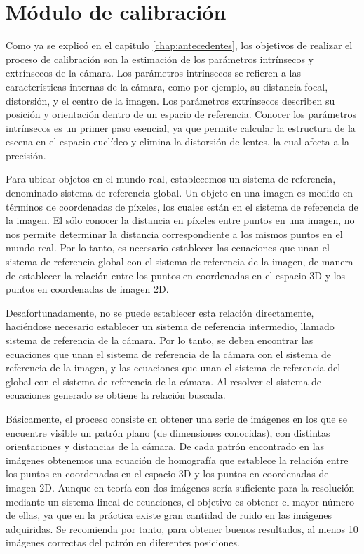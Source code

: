\section{Módulo de calibración}
Como ya se explicó en el capitulo \ref{chap:antecedentes}, los objetivos de realizar el proceso de calibración son la estimación de los parámetros intrínsecos y extrínsecos de la cámara. Los parámetros intrínsecos se refieren a las características internas de la cámara, como por ejemplo, su distancia focal, distorsión, y el centro de la imagen. Los parámetros extrínsecos describen su posición y orientación dentro de un espacio de referencia. Conocer los parámetros intrínsecos es un primer paso esencial, ya que permite calcular la estructura de la escena en el espacio euclídeo y elimina la distorsión de lentes, la cual afecta a la precisión.

Para ubicar objetos en el mundo real, establecemos un sistema de referencia, denominado sistema de referencia global. Un objeto en una imagen es medido en términos de coordenadas de píxeles, los cuales están en el sistema de referencia de la imagen. El sólo conocer la distancia en píxeles entre puntos en una imagen, no nos permite determinar la distancia correspondiente a los mismos puntos en el mundo real. Por lo tanto, es necesario establecer las ecuaciones que unan el sistema de referencia global con el sistema de referencia de la imagen, de manera de establecer la relación entre los puntos en coordenadas en el espacio 3D y los puntos en coordenadas de imagen 2D. 

Desafortunadamente, no se puede establecer esta relación directamente, haciéndose necesario establecer un sistema de referencia intermedio, llamado sistema de referencia de la cámara. Por lo tanto, se deben encontrar las ecuaciones que unan el sistema de referencia de la cámara con el sistema de referencia de la imagen, y las ecuaciones que unan el sistema  de referencia del global con el sistema de referencia de la cámara. Al resolver el sistema de ecuaciones generado se obtiene la relación buscada.

Básicamente, el proceso consiste en obtener una serie de imágenes en los que se encuentre visible un patrón plano (de dimensiones conocidas), con distintas orientaciones y distancias de la cámara. De cada patrón encontrado en las imágenes obtenemos una ecuación de homografía que establece la relación entre los puntos en coordenadas en el espacio 3D y los puntos en coordenadas de imagen 2D. Aunque en teoría con dos imágenes sería suficiente para la resolución mediante un sistema lineal de ecuaciones, el objetivo es obtener el mayor número de ellas, ya que en la práctica existe gran cantidad de ruido en las imágenes adquiridas. Se recomienda por tanto, para obtener buenos resultados, al menos 10 imágenes correctas del patrón en diferentes posiciones.

